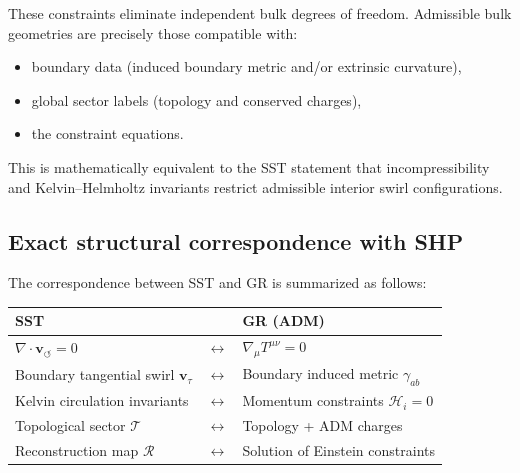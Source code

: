 \documentclass[11pt]{article}
\begin{document}
        These constraints eliminate independent bulk degrees of freedom. Admissible bulk
        geometries are precisely those compatible with:
        \begin{itemize}
            \item boundary data (induced boundary metric and/or extrinsic curvature),
            \item global sector labels (topology and conserved charges),
            \item the constraint equations.
        \end{itemize}

        This is mathematically equivalent to the SST statement that incompressibility and
        Kelvin--Helmholtz invariants restrict admissible interior swirl configurations.

    \subsection{Exact structural correspondence with SHP}

        The correspondence between SST and GR is summarized as follows:

        \begin{center}
            \begin{tabular}{lll}
                \toprule
                \textbf{SST} & & \textbf{GR (ADM)} \\
                \midrule
                $\nabla\cdot \mathbf{v}_{\!\boldsymbol{\circlearrowleft}} = 0$
                & $\longleftrightarrow$ &
                $\nabla_\mu T^{\mu\nu} = 0$ \\[6pt]

                Boundary tangential swirl $\mathbf{v}_\tau$
                & $\longleftrightarrow$ &
                Boundary induced metric $\gamma_{ab}$ \\[6pt]

                Kelvin circulation invariants
                & $\longleftrightarrow$ &
                Momentum constraints $\mathcal{H}_i=0$ \\[6pt]

                Topological sector $\mathcal{T}$
                & $\longleftrightarrow$ &
                Topology + ADM charges \\[6pt]

                Reconstruction map $\mathcal{R}$
                & $\longleftrightarrow$ &
                Solution of Einstein constraints \\[6pt]
                \bottomrule
            \end{tabular}
        \end{center}
\end{document}
